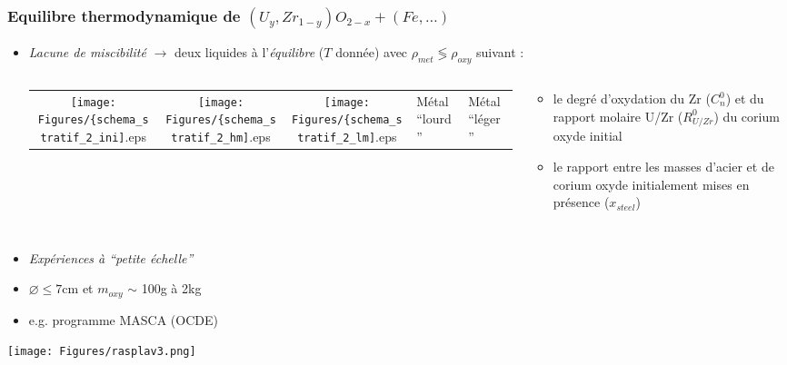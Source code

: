 \subsubsection{Equilibre thermodynamique de $\left(U_y,Zr_{1-y}\right)O_{2-x}+\left(Fe, \dots\right)$}
\begin{frame}
      \baselineskip
      \begin{itemize}
\item \emph{Lacune de miscibilité} $\rightarrow$ deux liquides à l'\emph{équilibre} ($T$ donnée) avec \emph{$\rho_{met}\lessgtr \rho_{oxy}$} suivant :
\begin{columns}[T]
  \begin{column}{0.45\textwidth}
    \begin{tabularx}{\textwidth}{CCC}
    \texttt{[image: Figures/\{schema\_stratif\_2\_ini]}.eps} & 
    \texttt{[image: Figures/\{schema\_stratif\_2\_hm]}.eps} &
    \texttt{[image: Figures/\{schema\_stratif\_2\_lm]}.eps} \n
    \tiny Etat initial & \tiny Métal ``lourd'' & \tiny Métal ``léger''
    \end{tabularx}
  \end{column}
  \begin{column}{0.6\textwidth} 
  \begin{itemize}
    \item le degré d’oxydation du Zr ($C_n^0$) et du rapport molaire U/Zr ($R_{U/Zr}^0$) du corium oxyde initial
    \item le rapport entre les masses d'acier et de corium oxyde initialement mises en présence ($x_{steel}$)
  \end{itemize}
  \end{column}
\end{columns}
\end{itemize}
\begin{columns}[T]
  \begin{column}{0.4\textwidth}
  \begin{itemize}
    \item \emph{Expériences à ``petite échelle''}
    \item $\diameter \le 7$cm et $m_{oxy}$ $\sim$ 100g à 2kg
    \item e.g. programme MASCA (OCDE) \cite{Tsurikov2007}
  \end{itemize}
  \texttt{[image: Figures/rasplav3.png]} 
  \end{column}

\end{columns}
\end{frame}

